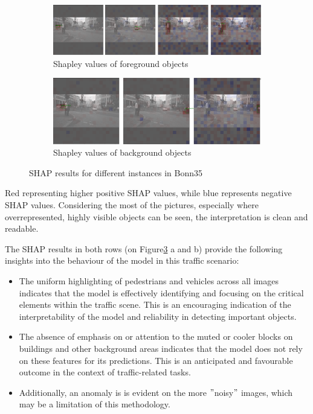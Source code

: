 \begin{figure}[h]
    \centering
    \begin{subfigure}[b]{\textwidth}
        \includegraphics[width=\textwidth]{figures/output1}
        \caption{Shapley values of foreground objects}\label{fig:SHAP_results11}
    \end{subfigure}
    \hfill
    \begin{subfigure}[b]{\textwidth}
        \includegraphics[width=\textwidth]{figures/output1,2}
        \caption{Shapley values of background objects}\label{fig:SHAP_results12}
    \end{subfigure}
    \hfill
    \caption{SHAP results for different instances in Bonn35}
    \label{fig:SHAP_result}
\end{figure}


Red representing higher positive SHAP values, while blue represents negative SHAP values.
Considering the most of the pictures, especially where overrepresented, highly visible objects can be seen, the interpretation is clean and readable.


The SHAP results in both rows (on Figure\ref{fig:SHAP_result} a and b) provide the following insights into the behaviour of the model in this traffic scenario:

\begin{itemize}
\item The uniform highlighting of pedestrians and vehicles across all images indicates that the model is effectively identifying and focusing on the critical elements within the traffic scene. This is an encouraging indication of the interpretability of the model and reliability in detecting important objects.
\item The absence of emphasis on or attention to the muted or cooler blocks on buildings and other background areas indicates that the model does not rely on these features for its predictions. This is an anticipated and favourable outcome in the context of traffic-related tasks.
\item Additionally, an anomaly is is evident on the more \("\)noisy\("\) images, which may be a limitation of this methodology.
\end{itemize}




